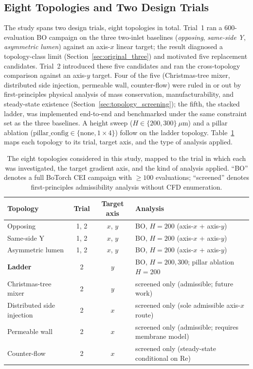 \documentclass[12pt]{article}
\begin{document}
\subsection{Eight Topologies and Two Design Trials}
\label{sec:eight_topologies}
The study spans two design trials, eight topologies in total. Trial~1 ran a $600$-evaluation BO campaign on the three two-inlet baselines (\emph{opposing}, \emph{same-side Y}, \emph{asymmetric lumen}) against an axis-$x$ linear target; the result diagnosed a topology-class limit (Section~\ref{sec:original_three}) and motivated five replacement candidates. Trial~2 introduced these five candidates and ran the cross-topology comparison against an axis-$y$ target. Four of the five (Christmas-tree mixer, distributed side injection, permeable wall, counter-flow) were ruled in or out by first-principles physical analysis of mass conservation, manufacturability, and steady-state existence (Section~\ref{sec:topology_screening}); the fifth, the stacked ladder, was implemented end-to-end and benchmarked under the same constraint set as the three baselines. A height sweep ($H \in \{200, 300\}~\mu$m) and a pillar ablation ($\text{pillar\_config} \in \{\text{none}, 1\!\times\!4\}$) follow on the ladder topology. Table~\ref{tab:topology_overview} maps each topology to its trial, target axis, and the type of analysis applied.

\begin{table}[H]
\centering
\caption{The eight topologies considered in this study, mapped to the trial in which each was investigated, the target gradient axis, and the kind of analysis applied. ``BO'' denotes a full BoTorch CEI campaign with $\geq 100$ evaluations; ``screened'' denotes first-principles admissibility analysis without CFD enumeration.}
\label{tab:topology_overview}
\begin{tabular}{l c c l}
\toprule
\textbf{Topology} & \textbf{Trial} & \textbf{Target axis} & \textbf{Analysis} \\
\midrule
Opposing                  & 1, 2 & $x$, $y$ & BO, $H{=}200$ (axis-$x$ + axis-$y$) \\
Same-side Y               & 1, 2 & $x$, $y$ & BO, $H{=}200$ (axis-$x$ + axis-$y$) \\
Asymmetric lumen          & 1, 2 & $x$, $y$ & BO, $H{=}200$ (axis-$x$ + axis-$y$) \\
\textbf{Ladder}           & 2 & $y$ & BO, $H{=}200,300$; pillar ablation $H{=}200$ \\
Christmas-tree mixer      & 2 & $y$ & screened only (admissible; future work) \\
Distributed side injection& 2 & $x$ & screened only (sole admissible axis-$x$ route) \\
Permeable wall            & 2 & $x$ & screened only (admissible; requires membrane model) \\
Counter-flow              & 2 & $x$ & screened only (steady-state conditional on Re) \\
\bottomrule
\end{tabular}
\end{table}
\end{document}
